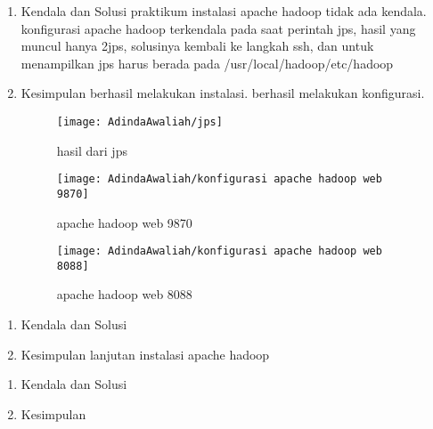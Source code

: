 
\begin{enumerate}
\item Kendala dan Solusi
\newline praktikum instalasi apache hadoop tidak ada kendala. konfigurasi apache hadoop terkendala pada saat perintah jps, hasil yang muncul hanya 2jps, solusinya kembali ke langkah ssh, dan untuk menampilkan jps harus berada pada /usr/local/hadoop/etc/hadoop

\item Kesimpulan
\newline berhasil melakukan instalasi. berhasil melakukan konfigurasi.

\begin{figure}[!ht]
\texttt{[image: AdindaAwaliah/jps]}
\caption{hasil dari jps}
\label{gam:jps}
\end{figure}

\begin{figure}
\texttt{[image: AdindaAwaliah/konfigurasi apache hadoop web 9870]}
\caption{apache hadoop web 9870}
\label{gam:konfigurasi apache hadoop web 9870}
\end{figure}

\begin{figure}
\texttt{[image: AdindaAwaliah/konfigurasi apache hadoop web 8088]}
\caption{apache hadoop web 8088}
\label{gam:konfigurasi apache hadoop web 8088}
\end{figure}

\end{enumerate}

\begin{enumerate}
\item Kendala dan Solusi

\item Kesimpulan
\newline lanjutan instalasi apache hadoop

\end{enumerate}


\begin{enumerate}
\item Kendala dan Solusi

\item Kesimpulan

\end{enumerate}

